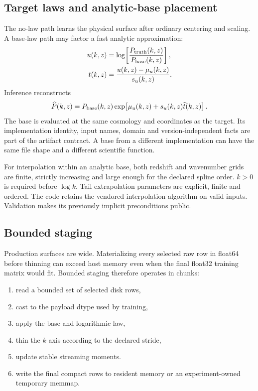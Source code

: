 \documentclass[10pt,aps,prd,twocolumn,nofootinbib]{revtex4-2}
\begin{document}
\subsection{Target laws and analytic-base placement}

The no-law path learns the physical surface after ordinary centering and
scaling.  A base-law path may factor a fast analytic approximation:
\begin{equation*}
\begin{aligned}
  u(k,z)&=\log\!\left[\frac{P_{\rm truth}(k,z)}
                                  {P_{\rm base}(k,z)}\right],\\
  t(k,z)&=\frac{u(k,z)-\mu_u(k,z)}{s_u(k,z)}.
\end{aligned}
\end{equation*}
Inference reconstructs
\begin{equation*}
  \widehat P(k,z)
  =P_{\rm base}(k,z)
   \exp\!\left[\mu_u(k,z)+s_u(k,z)\widehat t(k,z)\right].
\end{equation*}
The base is evaluated at the same cosmology and coordinates as the target.
Its implementation identity, input names, domain and version-independent
facts are part of the artifact contract.  A base from a different
implementation can have the same file shape and a different scientific
function.

For interpolation within an analytic base, both redshift and wavenumber grids
are finite, strictly increasing and large enough for the declared spline
order.  \(k>0\) is required before \(\log k\).  Tail extrapolation parameters
are explicit, finite and ordered.  The code retains the vendored
interpolation algorithm on valid inputs.  Validation makes its previously
implicit preconditions public.

\subsection{Bounded staging}

Production surfaces are wide.  Materializing every selected raw row in
float64 before thinning can exceed host memory even when the final float32
training matrix would fit.  Bounded staging therefore operates in chunks:
\begin{enumerate}
  \item read a bounded set of selected disk rows,
  \item cast to the payload dtype used by training,
  \item apply the base and logarithmic law,
  \item thin the \(k\) axis according to the declared stride,
  \item update stable streaming moments.
  \item write the final compact rows to resident memory or an
        experiment-owned temporary memmap.
\end{enumerate}
\end{document}
